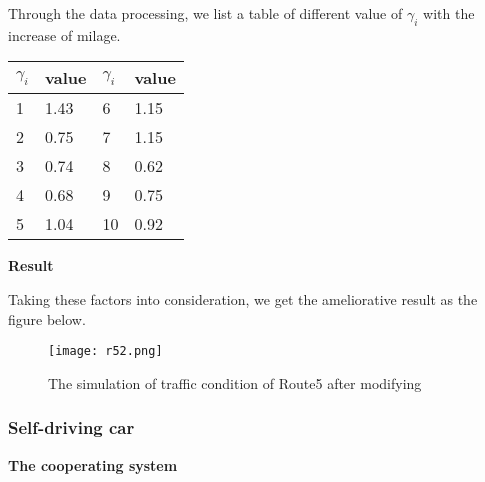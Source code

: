 \documentclass{mcmthesis}
\numberwithin{equation}{section}
\begin{document}
\begin{itemize}
							Through the data processing, we list a table of different value of $\gamma_{i}$ with the increase of milage. 
							\begin{table}[H]
								\caption{The value of $\gamma_{i}$}
								\begin{center}
									\begin{longtable}{| m{60pt}<{\centering} | m{60pt}<{\centering} | m{60pt}<{\centering} | m{60pt}<{\centering} | }
										\hline%
										$\gamma_{i}$	& 	value	& 	$\gamma_{i}$ 	& 	value	\\
										\hline%
											1			&	1.43	&		6 			&	1.15	\\
										\hline%
											2			&	0.75	&		7			&	1.15	\\
										\hline%
											3			&	0.74	&		8			&	0.62	\\
										\hline%
											4			&	0.68	&		9			&	0.75	\\
										\hline%
											5			&	1.04	&		10			&	0.92	\\
										\hline%
									\end{longtable}
								\end{center}
							\end{table}

					\end{itemize}
				\noindent \textbf{Result}

					Taking these factors into consideration, we get the ameliorative result as the figure below.
					\begin{figure}[H]
						\begin{center}
							\texttt{[image: r52.png]}
							\caption{The simulation of traffic condition of Route5 after modifying}
						\end{center}
					\end{figure}
			\subsubsection{Self-driving car}
				\noindent \textbf{The cooperating system}
\end{document}
